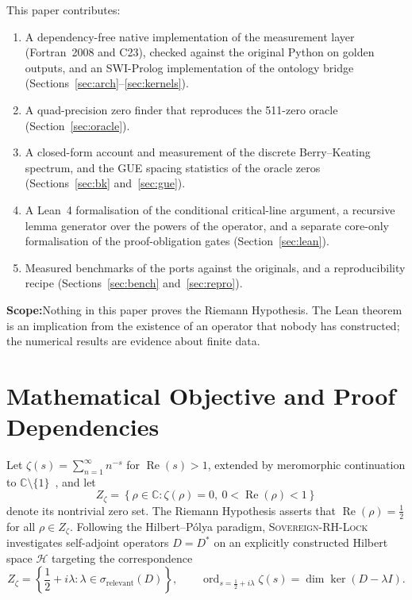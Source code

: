 \documentclass[11pt,letterpaper]{article}
\newcommand{\takeaway}[2]{%
  \vspace{6pt}\noindent\colorbox{primary!8}{%
    \parbox{\dimexpr\linewidth-2\fboxsep\relax}{%
      \vspace{3pt}\textbf{\color{primary}#1:}\hspace{0.5em}#2\vspace{3pt}%
    }%
  }\vspace{6pt}%
}
\begin{document}
This paper contributes:
\begin{enumerate}
  \item A dependency-free native implementation of the measurement layer (Fortran~2008 and C23), checked against the original Python on golden outputs, and an SWI-Prolog implementation of the ontology bridge (Sections~\ref{sec:arch}--\ref{sec:kernels}).
  \item A quad-precision zero finder that reproduces the 511-zero oracle (Section~\ref{sec:oracle}).
  \item A closed-form account and measurement of the discrete Berry--Keating spectrum, and the GUE spacing statistics of the oracle zeros (Sections~\ref{sec:bk} and~\ref{sec:gue}).
  \item A Lean~4 formalisation of the conditional critical-line argument, a recursive lemma generator over the powers of the operator, and a separate core-only formalisation of the proof-obligation gates (Section~\ref{sec:lean}).
  \item Measured benchmarks of the ports against the originals, and a reproducibility recipe (Sections~\ref{sec:bench} and~\ref{sec:repro}).
\end{enumerate}

\takeaway{Scope}{Nothing in this paper proves the Riemann Hypothesis. The Lean theorem is an implication from the existence of an operator that nobody has constructed; the numerical results are evidence about finite data.}

\section{Mathematical Objective and Proof Dependencies}
\label{sec:objective}

Let $\zeta(s) = \sum_{n=1}^{\infty} n^{-s}$ for $\operatorname{Re}(s) > 1$, extended by meromorphic continuation to $\mathbb{C} \setminus \{1\}$~\cite{riemann1859,titchmarsh1986,edwards1974}, and let
\begin{equation}
Z_\zeta = \left\{ \rho \in \mathbb{C} : \zeta(\rho) = 0,\ 0 < \operatorname{Re}(\rho) < 1 \right\}
\end{equation}
denote its nontrivial zero set. The Riemann Hypothesis asserts that $\operatorname{Re}(\rho) = \frac{1}{2}$ for all $\rho \in Z_\zeta$. Following the Hilbert--P\'olya paradigm, \textsc{Sovereign-RH-Lock} investigates self-adjoint operators $D = D^*$ on an explicitly constructed Hilbert space $\mathcal{H}$ targeting the correspondence
\begin{equation}
\label{eq:corr}
Z_\zeta = \left\{ \frac{1}{2} + i\lambda : \lambda \in \sigma_{\mathrm{relevant}}(D) \right\}, \qquad \operatorname{ord}_{s = \frac{1}{2} + i\lambda}\zeta(s) = \dim\ker(D - \lambda I).
\end{equation}
\end{document}
